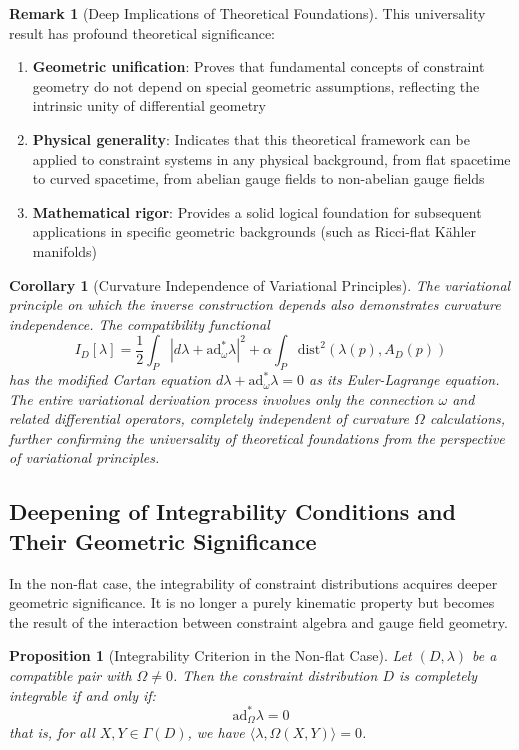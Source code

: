 \documentclass[a4paper,12pt]{extarticle}
\newtheorem{proposition}[theorem]{Proposition}
\newtheorem{corollary}[theorem]{Corollary}
\theoremstyle{definition}
\newtheorem{remark}{Remark}
\begin{document}
\begin{remark}[Deep Implications of Theoretical Foundations]
This universality result has profound theoretical significance:
\begin{enumerate}
\item \textbf{Geometric unification}: Proves that fundamental concepts of constraint geometry do not depend on special geometric assumptions, reflecting the intrinsic unity of differential geometry
\item \textbf{Physical generality}: Indicates that this theoretical framework can be applied to constraint systems in any physical background, from flat spacetime to curved spacetime, from abelian gauge fields to non-abelian gauge fields
\item \textbf{Mathematical rigor}: Provides a solid logical foundation for subsequent applications in specific geometric backgrounds (such as Ricci-flat Kähler manifolds)
\end{enumerate}
\end{remark}

\begin{corollary}[Curvature Independence of Variational Principles]
The variational principle on which the inverse construction depends also demonstrates curvature independence. The compatibility functional
$$I_D[\lambda] = \frac{1}{2}\int_P |d\lambda + \text{ad}_\omega^* \lambda|^2 + \alpha \int_P \text{dist}^2(\lambda(p), A_D(p))$$
has the modified Cartan equation $d\lambda + \text{ad}_\omega^* \lambda = 0$ as its Euler-Lagrange equation. The entire variational derivation process involves only the connection $\omega$ and related differential operators, completely independent of curvature $\Omega$ calculations, further confirming the universality of theoretical foundations from the perspective of variational principles.
\end{corollary}


\subsection{Deepening of Integrability Conditions and Their Geometric Significance}

In the non-flat case, the integrability of constraint distributions acquires deeper geometric significance. It is no longer a purely kinematic property but becomes the result of the interaction between constraint algebra and gauge field geometry.

\begin{proposition}[Integrability Criterion in the Non-flat Case]
Let $(D, \lambda)$ be a compatible pair with $\Omega \neq 0$. Then the constraint distribution $D$ is completely integrable if and only if:
$$\text{ad}_\Omega^* \lambda = 0$$
that is, for all $X, Y \in \Gamma(D)$, we have $\langle\lambda, \Omega(X, Y)\rangle = 0$.
\end{proposition}
\end{document}
